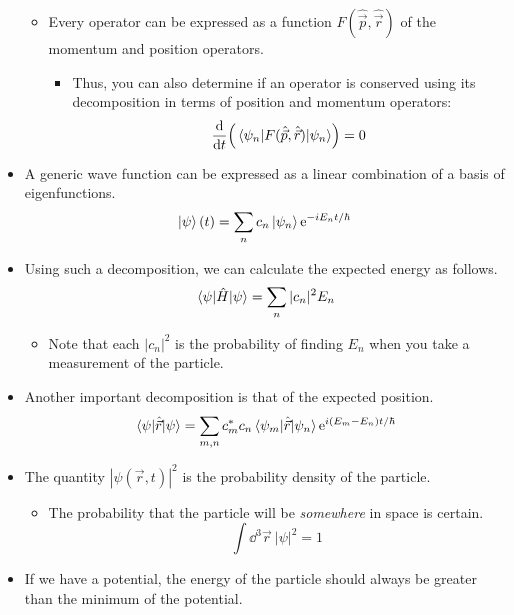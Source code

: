 \documentclass[../notes.tex]{subfiles}
\begin{document}
\begin{itemize}
\begin{itemize}
        \item Every operator can be expressed as a function $F(\hat{\vec{p}},\hat{\vec{r}})$ of the momentum and position operators.
        \begin{itemize}
            \item Thus, you can also determine if an operator is conserved using its decomposition in terms of position and momentum operators:
            \begin{equation*}
                \dv{t}(\ev{F(\hat{\vec{p}},\hat{\vec{r}})}{\psi_n}) = 0
            \end{equation*}
        \end{itemize}
    \end{itemize}
    \item A generic wave function can be expressed as a linear combination of a basis of eigenfunctions.
    \begin{equation*}
        \ket{\psi}(t) = \sum_nc_n\ket{\psi_n}\e[-iE_nt/\hbar]
    \end{equation*}
    \item Using such a decomposition, we can calculate the expected energy as follows.
    \begin{equation*}
        \ev{\hat{H}}{\psi} = \sum_n|c_n|^2E_n
    \end{equation*}
    \begin{itemize}
        \item Note that each $|c_n|^2$ is the probability of finding $E_n$ when you take a measurement of the particle.
    \end{itemize}
    \item Another important decomposition is that of the expected position.
    \begin{equation*}
        \ev{\hat{\vec{r}}}{\psi} = \sum_{m,n}c_m^*c_n\mel{\psi_m}{\hat{\vec{r}}}{\psi_n}\e[i(E_m-E_n)t/\hbar]
    \end{equation*}
    \item The quantity $|\psi(\vec{r},t)|^2$ is the probability density of the particle.
    \begin{itemize}
        \item The probability that the particle will be \emph{somewhere} in space is certain.
        \begin{equation*}
            \int\dd^3\vec{r}\ |\psi|^2 = 1
        \end{equation*}
    \end{itemize}
    \item If we have a potential, the energy of the particle should always be greater than the minimum of the potential.

\end{itemize}
\end{document}
